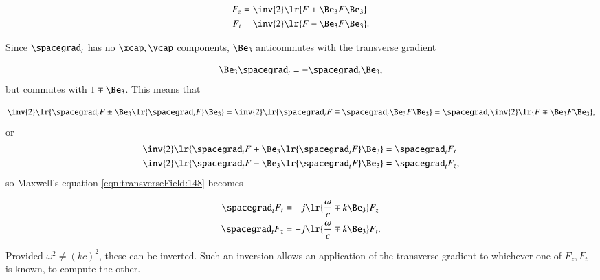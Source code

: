 \begin{dmath}\label{eqn:transverseField:128}
\begin{aligned}
F_z &= \inv{2} \lr{ F + \Be_3 F \Be_3 } \\
F_t &= \inv{2} \lr{ F - \Be_3 F \Be_3 }.
\end{aligned}
\end{dmath}

Since \( \spacegrad_t \) has no \( \xcap, \ycap \) components, \( \Be_3 \) anticommutes with the transverse gradient

\begin{dmath}\label{eqn:transverseField:168}
\Be_3 \spacegrad_t = - \spacegrad_t \Be_3,
\end{dmath}
but commutes with \( 1 \mp \Be_3 \).
This means that

\begin{dmath}\label{eqn:transverseField:188}
\inv{2} \lr{ \spacegrad_t F \pm \Be_3 \lr{ \spacegrad_t F } \Be_3 }
=
\inv{2} \lr{ \spacegrad_t F \mp \spacegrad_t \Be_3 F \Be_3 }
=
\spacegrad_t
\inv{2} \lr{ F \mp \Be_3 F \Be_3 },
\end{dmath}
or
\begin{dmath}\label{eqn:transverseField:208}
\begin{aligned}
\inv{2} \lr{ \spacegrad_t F + \Be_3 \lr{ \spacegrad_t F } \Be_3 } &= \spacegrad_t F_t \\
\inv{2} \lr{ \spacegrad_t F - \Be_3 \lr{ \spacegrad_t F } \Be_3 } &= \spacegrad_t F_z,
\end{aligned}
\end{dmath}
so Maxwell's equation \cref{eqn:transverseField:148} becomes

\begin{dmath}\label{eqn:transverseField:228}
\begin{aligned}
\spacegrad_t F_t &= - j \lr{ \frac{\omega}{c} \mp k \Be_3 } F_z \\
\spacegrad_t F_z &= - j \lr{ \frac{\omega}{c} \mp k \Be_3 } F_t.
\end{aligned}
\end{dmath}

Provided \( \omega^2 \ne (k c)^2 \), these can be inverted.
Such an inversion allows an application of the transverse gradient to whichever one
of \( F_z, F_t \) is known, to compute the other.


